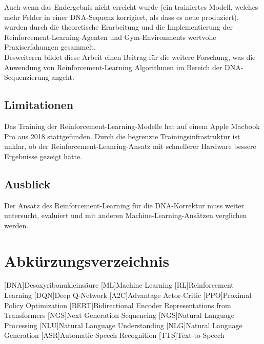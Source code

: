 \documentclass[oneside,bibliography=totocnumbered,BCOR=5mm]{scrbook}%
\theoremstyle{definition}
\theoremstyle{definition}
\theoremstyle{definition}
\theoremstyle{definition}
\theoremstyle{definition}
\theoremstyle{definition}
\begin{document}
Auch wenn das Endergebnis nicht erreicht wurde (ein trainiertes Modell, welches mehr Fehler in einer DNA-Sequenz
korrigiert, als dass es neue produziert), wurden durch die theoretische Erarbeitung und
die Implementierung der Reinforcement-Learning-Agenten und Gym-Environments wertvolle Praxiserfahungen
gesammelt. \\

Desweiteren bildet diese Arbeit einen Beitrag für die weitere Forschung, was die Anwendung
von Reinforcement-Learning Algorithmen im Bereich der DNA-Sequenzierung angeht. \\

\section{Limitationen}
Das Training der Reinforcement-Learning-Modelle hat auf einem Apple Macbook Pro aus 2018 stattgefunden. 
Durch die begrenzte Trainingsinfrastruktur ist unklar, ob der Reinforcement-Leanring-Ansatz
mit schnellerer Hardware bessere Ergebnisse gezeigt hätte.

\section{Ausblick}
Der Ansatz des Reinforcement-Learning für die DNA-Korrektur muss weiter untersucht, evaluiert und
mit anderen Machine-Learning-Ansätzen verglichen werden.







\printbibliography[
heading=bibintoc,
title={Bibliography}
]


\newpage

\chapter{Abkürzungsverzeichnis}
\begin{acronym}

  [DNA]{Desoxyribonukleinsäure}
  [ML]{Machine Learning}
  [RL]{Reinforcement Learning}
  [DQN]{Deep Q-Network}
  [A2C]{Advantage Actor-Critic}
  [PPO]{Proximal Policy Optimization}
  [BERT]{Bidirectional Encoder Representations from Transformers}
  [NGS]{Next Generation Sequencing}
  [NGS]{Natural Language Processing}
  [NLU]{Natural Language Understanding}
  [NLG]{Natural Language Generation}
  [ASR]{Automatic Speech Recognition}
  [TTS]{Text-to-Speech}
  
\end{acronym}
\end{document}
